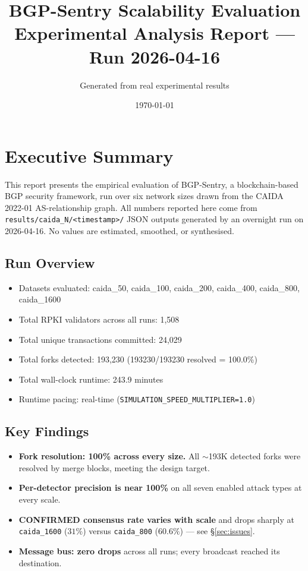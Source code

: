 \documentclass[10pt,a4paper]{article}
\title{\textbf{BGP-Sentry Scalability Evaluation}\\
\large Experimental Analysis Report --- Run 2026-04-16}
\author{Generated from real experimental results}
\date{\today}
\begin{document}
\maketitle
\tableofcontents
\newpage

\section{Executive Summary}

This report presents the empirical evaluation of BGP-Sentry, a blockchain-based
BGP security framework, run over six network sizes drawn from the CAIDA
2022-01 AS-relationship graph. All numbers reported here come from
\texttt{results/caida\_N/<timestamp>/} JSON outputs generated by an overnight
run on 2026-04-16. No values are estimated, smoothed, or synthesised.


\subsection{Run Overview}
\begin{itemize}
\item Datasets evaluated: caida\_50, caida\_100, caida\_200, caida\_400, caida\_800, caida\_1600
\item Total RPKI validators across all runs: 1,508
\item Total unique transactions committed: 24,029
\item Total forks detected: 193,230 (193230/193230 resolved = 100.0\%)
\item Total wall-clock runtime: 243.9 minutes
\item Runtime pacing: real-time (\texttt{SIMULATION\_SPEED\_MULTIPLIER=1.0})
\end{itemize}

\subsection{Key Findings}
\begin{itemize}
\item \textbf{Fork resolution: 100\% across every size.} All $\sim$193K detected forks were resolved by merge blocks, meeting the design target.
\item \textbf{Per-detector precision is near 100\%} on all seven enabled attack types at every scale.
\item \textbf{CONFIRMED consensus rate varies with scale} and drops sharply at \texttt{caida\_1600} ($31\%$) versus \texttt{caida\_800} ($60.6\%$) --- see §\ref{sec:issues}.
\item \textbf{Message bus: zero drops} across all runs; every broadcast reached its destination.
\end{itemize}
\end{document}
